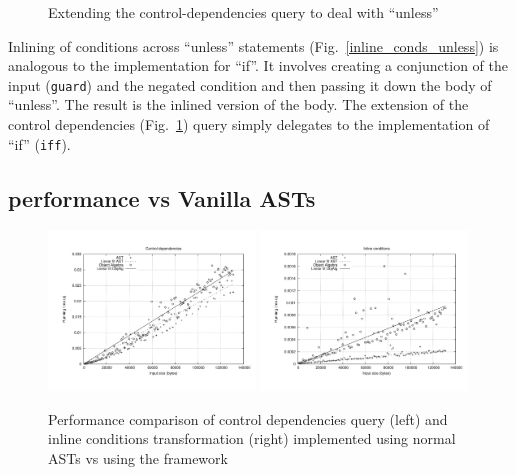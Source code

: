 \begin{figure}[tb]
\vspace{-.1in}
\caption{Extending the control-dependencies query to deal with ``unless''}
\label{controldeps_unless}
\end{figure}

Inlining of conditions across ``unless'' statements (Fig.~\ref{inline_conds_unless}) is analogous to the implementation for ``if''.
It involves creating a conjunction of the input (\lstinline{guard}) and the negated condition and then passing it down the body of ``unless''. The result is the inlined version of the body.
The extension of the control dependencies (Fig.~\ref{controldeps_unless}) query simply delegates to the implementation of ``if'' (\lstinline{iff}). 

\subsection{\name performance vs Vanilla ASTs}

\begin{figure}[t]
  \includegraphics[width=0.49\textwidth]{plots/controldeps}
  \includegraphics[width=0.49\textwidth]{plots/inline}
  \caption{Performance comparison of control dependencies query (left) and inline conditions transformation (right) implemented using normal ASTs vs using the \name framework\label{FIG:performance}}
\end{figure}

